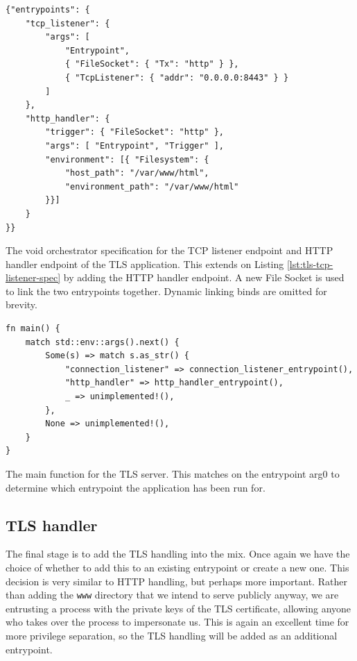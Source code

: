 \documentclass[12pt,a4paper,twoside]{report}
\begin{document}
\begin{listing}
\begin{verbatim}
{"entrypoints": {
    "tcp_listener": {
        "args": [
            "Entrypoint",
            { "FileSocket": { "Tx": "http" } },
            { "TcpListener": { "addr": "0.0.0.0:8443" } }
        ]
    },
    "http_handler": {
        "trigger": { "FileSocket": "http" },
        "args": [ "Entrypoint", "Trigger" ],
        "environment": [{ "Filesystem": {
            "host_path": "/var/www/html",
            "environment_path": "/var/www/html"
        }}]
    }
}}
\end{verbatim}

\caption{The void orchestrator specification for the TCP listener endpoint and HTTP handler endpoint of the TLS application. This extends on Listing \ref{lst:tls-tcp-listener-spec} by adding the HTTP handler endpoint. A new File Socket is used to link the two entrypoints together. Dynamic linking binds are omitted for brevity.}
\label{lst:tls-http-handler-spec}
\end{listing}

\begin{listing}
\begin{verbatim}
fn main() {
    match std::env::args().next() {
        Some(s) => match s.as_str() {
            "connection_listener" => connection_listener_entrypoint(),
            "http_handler" => http_handler_entrypoint(),
            _ => unimplemented!(),
        },
        None => unimplemented!(),
    }
}
\end{verbatim}

\caption{The main function for the TLS server. This matches on the entrypoint arg0 to determine which entrypoint the application has been run for.}
\label{lst:tls-main-function}
\end{listing}

\subsection{TLS handler}
\label{sec:building-tls-tls-handler}

The final stage is to add the TLS handling into the mix. Once again we have the choice of whether to add this to an existing entrypoint or create a new one. This decision is very similar to HTTP handling, but perhaps more important. Rather than adding the \texttt{www} directory that we intend to serve publicly anyway, we are entrusting a process with the private keys of the TLS certificate, allowing anyone who takes over the process to impersonate us. This is again an excellent time for more privilege separation, so the TLS handling will be added as an additional entrypoint.
\end{document}
